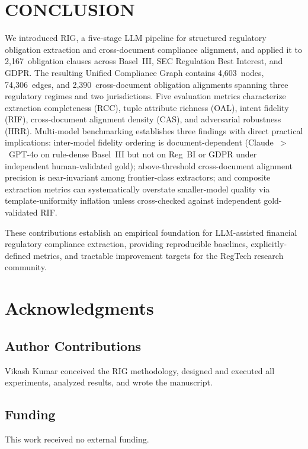 \documentclass{article}
\begin{document}
\section{CONCLUSION}

We introduced RIG, a five-stage LLM pipeline for structured regulatory
obligation extraction and cross-document compliance alignment, and
applied it to 2,167~obligation clauses across Basel~III, SEC
Regulation Best Interest, and GDPR.
The resulting Unified Compliance Graph contains 4,603~nodes,
74,306~edges, and 2,390~cross-document obligation alignments spanning
three regulatory regimes and two jurisdictions.
Five evaluation metrics characterize extraction completeness
(RCC), tuple attribute richness (OAL), intent fidelity (RIF),
cross-document alignment density (CAS), and adversarial robustness
(HRR).
Multi-model benchmarking establishes three findings with direct
practical implications: inter-model fidelity ordering is
document-dependent (Claude~$>$~GPT-4o on rule-dense Basel~III but not
on Reg~BI or GDPR under independent human-validated gold);
above-threshold cross-document alignment precision is near-invariant
among frontier-class extractors; and composite extraction metrics
can systematically overstate smaller-model quality via
template-uniformity inflation unless cross-checked against
independent gold-validated RIF.

These contributions establish an empirical foundation
for LLM-assisted financial regulatory compliance extraction, providing
reproducible baselines, explicitly-defined metrics, and tractable
improvement targets for the RegTech research community.

\section*{Acknowledgments}

\subsection*{Author Contributions}
Vikash Kumar conceived the RIG methodology, designed and executed all
experiments, analyzed results, and wrote the manuscript.

\subsection*{Funding}
This work received no external funding.
\end{document}
